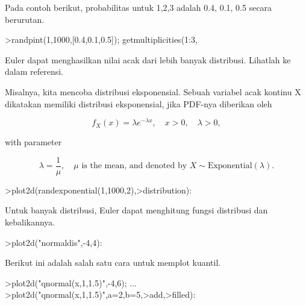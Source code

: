 \documentclass[a4paper,10pt]{article}
\begin{document}
\begin{eulernotebook}
\begin{eulercomment}
Pada contoh berikut, probabilitas untuk 1,2,3 adalah 0.4, 0.1, 0.5
secara berurutan.
\end{eulercomment}
\begin{eulerprompt}
>randpint(1,1000,[0.4,0.1,0.5]); getmultiplicities(1:3,%
\end{eulerprompt}
\begin{euleroutput}
  [378,  102,  520]
\end{euleroutput}
\begin{eulercomment}
Euler dapat menghasilkan nilai acak dari lebih banyak distribusi.
Lihatlah ke dalam referensi.

Misalnya, kita mencoba distribusi eksponensial. Sebuah variabel acak
kontinu X dikatakan memiliki distribusi eksponensial, jika PDF-nya
diberikan oleh

\end{eulercomment}
\begin{eulerformula}
\[
f_X(x)=\lambda e^{-\lambda x},\quad x>0,\quad \lambda>0,
\]
\end{eulerformula}
\begin{eulercomment}
with parameter\\
\end{eulercomment}
\begin{eulerformula}
\[
\lambda=\frac{1}{\mu},\quad \mu \text{ is the mean, and denoted by } X \sim \text{Exponential}(\lambda).
\]
\end{eulerformula}
\begin{eulerprompt}
>plot2d(randexponential(1,1000,2),>distribution):
\end{eulerprompt}
\begin{eulercomment}
Untuk banyak distribusi, Euler dapat menghitung fungsi distribusi dan
kebalikannya.
\end{eulercomment}
\begin{eulerprompt}
>plot2d("normaldis",-4,4): 
\end{eulerprompt}
\begin{eulercomment}
Berikut ini adalah salah satu cara untuk memplot kuantil.
\end{eulercomment}
\begin{eulerprompt}
>plot2d("qnormal(x,1,1.5)",-4,6);  ...
>plot2d("qnormal(x,1,1.5)",a=2,b=5,>add,>filled):
\end{eulerprompt}

\end{eulernotebook}
\end{document}
